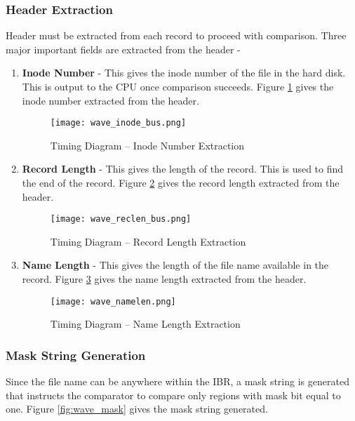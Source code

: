 \subsubsection{Header Extraction}
    Header must be extracted from each record to proceed with comparison. Three major important fields are extracted from the header -
    \begin{enumerate}
        \item \textbf{Inode Number} - This gives the inode number of the file in the hard disk. This is output to the CPU once comparison succeeds. Figure \ref{fig:wave_inode} gives the inode number extracted from the header.

    \begin{figure}[!ht]

	    
	    \centering
	    \texttt{[image: wave\_inode\_bus.png]}
	    \caption{ Timing Diagram -- Inode Number Extraction}
         \label{fig:wave_inode}	
    \end{figure}

        \item \textbf{Record Length} - This gives the length of the record. This is used to find the end of the record. Figure \ref{fig:wave_reclen} gives the record length extracted from the header.

    \begin{figure}[!ht]

	    
	    \centering
	    \texttt{[image: wave\_reclen\_bus.png]}
	    \caption{ Timing Diagram -- Record Length Extraction}
	    \label{fig:wave_reclen}
    \end{figure}

        \item \textbf{Name Length} - This gives the length of the file name available in the record. Figure \ref{fig:wave_namelen} gives the name length extracted from the header.

    \begin{figure}[!ht]
	    \centering
	    \texttt{[image: wave\_namelen.png]}
	    \caption{ Timing Diagram -- Name Length Extraction}
	    \label{fig:wave_namelen}
    \end{figure}


    \end{enumerate}

\subsubsection{Mask String Generation}
    Since the file name can be anywhere within the IBR, a mask string is generated that instructs the comparator to compare only regions with mask bit equal to one. Figure \ref{fig:wave_mask} gives the mask string generated.

